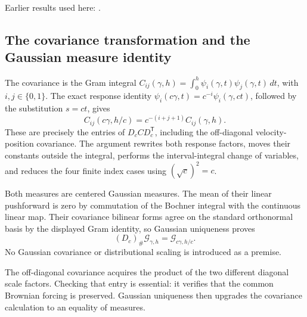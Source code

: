 \documentclass[11pt,a4paper]{report}
\begin{document}
Earlier results used here: \cite[Section~3.10.11]{LangevinLean2026Kinetic}.
\subsection{\texorpdfstring{The covariance transformation and the Gaussian measure identity}{The covariance transformation and the Gaussian measure identity}}
\label{report-step-KIPLMC-ExponentialRescaling-lean-2}


The covariance is the Gram integral \(C_{ij}(\gamma,h)=\int_0^h\psi_i(\gamma,t)\psi_j(\gamma,t)\,dt\), with \(i,j\in\{0,1\}\). The exact response identity \(\psi_i(c\gamma,t)=c^{-i}\psi_i(\gamma,ct)\), followed by the substitution \(s=ct\), gives \[C_{ij}(c\gamma,h/c)=c^{-(i+j+1)}C_{ij}(\gamma,h).\] These are precisely the entries of \(D_c C D_c^\mathsf T\), including the off-diagonal velocity-position covariance. The argument rewrites both response factors, moves their constants outside the integral, performs the interval-integral change of variables, and reduces the four finite index cases using \((\sqrt c)^2=c\).



Both measures are centered Gaussian measures. The mean of their linear pushforward is zero by commutation of the Bochner integral with the continuous linear map. Their covariance bilinear forms agree on the standard orthonormal basis by the displayed Gram identity, so Gaussian uniqueness proves \[(D_c)_\#\mathcal G_{\gamma,h}=\mathcal G_{c\gamma,h/c}.\] No Gaussian covariance or distributional scaling is introduced as a premise.



The off-diagonal covariance acquires the product of the two different diagonal scale factors. Checking that entry is essential: it verifies that the common Brownian forcing is preserved. Gaussian uniqueness then upgrades the covariance calculation to an equality of measures.
\end{document}
